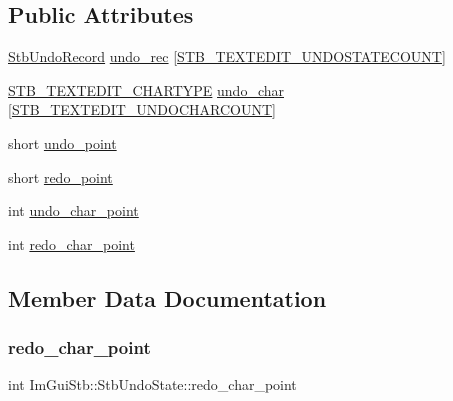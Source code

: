 \subsection*{Public Attributes}
\begin{DoxyCompactItemize}
\item 
\mbox{\hyperlink{struct_im_gui_stb_1_1_stb_undo_record}{Stb\+Undo\+Record}} \mbox{\hyperlink{struct_im_gui_stb_1_1_stb_undo_state_a3cba4c0766038584aa310a52e763bbda}{undo\+\_\+rec}} \mbox{[}\mbox{\hyperlink{imstb__textedit_8h_afa79483143df87a1497010712b3dfaf9}{S\+T\+B\+\_\+\+T\+E\+X\+T\+E\+D\+I\+T\+\_\+\+U\+N\+D\+O\+S\+T\+A\+T\+E\+C\+O\+U\+NT}}\mbox{]}
\item 
\mbox{\hyperlink{imstb__textedit_8h_a6e64031a061922e3a48d88fd8623f4c3}{S\+T\+B\+\_\+\+T\+E\+X\+T\+E\+D\+I\+T\+\_\+\+C\+H\+A\+R\+T\+Y\+PE}} \mbox{\hyperlink{struct_im_gui_stb_1_1_stb_undo_state_ad0f20ff04903ecdf613b8ad083937bbd}{undo\+\_\+char}} \mbox{[}\mbox{\hyperlink{imstb__textedit_8h_a15cbcac55cf92003c28c44734422756a}{S\+T\+B\+\_\+\+T\+E\+X\+T\+E\+D\+I\+T\+\_\+\+U\+N\+D\+O\+C\+H\+A\+R\+C\+O\+U\+NT}}\mbox{]}
\item 
short \mbox{\hyperlink{struct_im_gui_stb_1_1_stb_undo_state_a594ee4720e8280db9595f2d5419a279c}{undo\+\_\+point}}
\item 
short \mbox{\hyperlink{struct_im_gui_stb_1_1_stb_undo_state_a6562a15b41f003f411253fe34ca81612}{redo\+\_\+point}}
\item 
int \mbox{\hyperlink{struct_im_gui_stb_1_1_stb_undo_state_aa4e5aff16160b2ff29f5f00591209b6f}{undo\+\_\+char\+\_\+point}}
\item 
int \mbox{\hyperlink{struct_im_gui_stb_1_1_stb_undo_state_a68ea5f1b677b0d6f8d3b9b39d2bd89e3}{redo\+\_\+char\+\_\+point}}
\end{DoxyCompactItemize}


\subsection{Member Data Documentation}
\mbox{\label{struct_im_gui_stb_1_1_stb_undo_state_a68ea5f1b677b0d6f8d3b9b39d2bd89e3}} 
\subsubsection{\texorpdfstring{redo\+\_\+char\+\_\+point}{redo\_char\_point}}
{\footnotesize\ttfamily int Im\+Gui\+Stb\+::\+Stb\+Undo\+State\+::redo\+\_\+char\+\_\+point}

